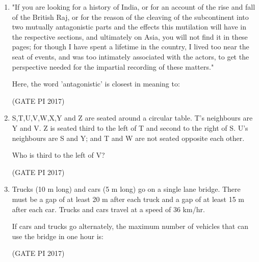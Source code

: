 \documentclass[journal,12pt,onecolumn]{IEEEtran}
\theoremstyle{remark}
\begin{document}
\begin{enumerate}
\item "If you are looking for a history of India, or for an account of the rise and fall of the British Raj,  
or for the reason of the cleaving of the subcontinent into two mutually antagonistic parts and the effects this mutilation will have in  
the respective sections, and ultimately on Asia, you will not find it in these pages; for though I have spent a lifetime in the country,  
I lived too near the seat of events, and was too intimately associated with the actors, to get the perspective needed for the  
impartial recording of these matters." 

Here, the word 'antagonistic' is closest in meaning to:
\begin{enumerate}
\end{enumerate}
\hfill (GATE PI 2017)

\item S,T,U,V,W,X,Y and Z are seated around a circular table.  
T's neighbours are Y and V. Z is seated third to the left of T and second to the right of S. U's neighbours are S and Y;  
and T and W are not seated opposite each other.  

Who is third to the left of V?
\begin{enumerate}
\end{enumerate}
\hfill (GATE PI 2017)

\item Trucks (10 m long) and cars (5 m long) go on a single lane bridge.  
There must be a gap of at least 20 m after each truck and a gap of at least 15 m after each car.  
Trucks and cars travel at a speed of 36 km/hr.  

If cars and trucks go alternately, the maximum number of vehicles that can use the bridge in one hour is:
\begin{enumerate}
\end{enumerate}
\hfill (GATE PI 2017)


\end{enumerate}
\end{document}
